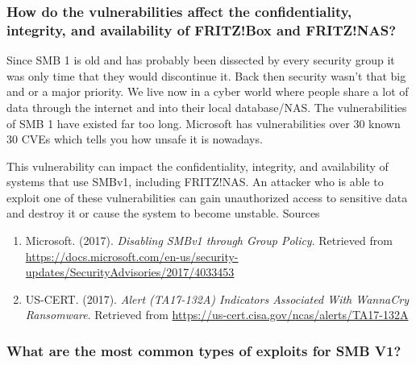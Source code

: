 \documentclass[12pt, letterpaper]{article}
\begin{document}
\newpage

\subsubsection{How do the vulnerabilities affect the confidentiality, integrity, and availability of FRITZ!Box and FRITZ!NAS?}
\hfill\break
Since SMB 1 is old and has probably been dissected by every security group it was only time that they would discontinue it. Back then security wasn't that big and or a major priority. We live now in a cyber world where people share a lot of data through the internet and into their local database/NAS.
\hfill\break
\hfill\break
The vulnerabilities of SMB 1 have existed far too long. Microsoft has vulnerabilities over 30 known 30 CVEs which tells you how unsafe it is nowadays.

\hfill\break
This vulnerability can impact the confidentiality, integrity, and availability of systems that use SMBv1, including FRITZ!NAS. An attacker who is able to exploit one of these vulnerabilities can gain unauthorized access to sensitive data and destroy it or cause the system to become unstable.
\hfill\break
\hfill\break
Sources
\begin{enumerate}
\item Microsoft. (2017). \textit{Disabling SMBv1 through Group Policy}. Retrieved from \url{https://docs.microsoft.com/en-us/security-updates/SecurityAdvisories/2017/4033453}

\item US-CERT. (2017). \textit{Alert (TA17-132A) Indicators Associated With WannaCry Ransomware}. Retrieved from \url{https://us-cert.cisa.gov/ncas/alerts/TA17-132A}
\end{enumerate}

\newpage
\subsubsection{What are the most common types of exploits for SMB V1?}
\end{document}
